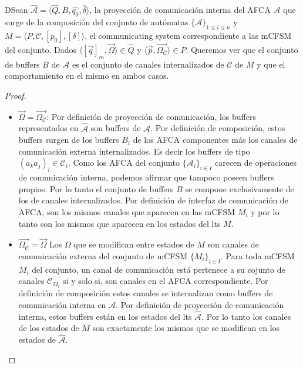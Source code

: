 \begin{lemma}\label{lemma2} DSean $\hat{\mathcal{A}}=\langle \hat{Q}, B, \hat{q_0}, \hat{\delta} \rangle$, la proyección de comunicación interna del AFCA $\mathcal{A}$ que surge de la composición del conjunto de autómatas  $\{\mathcal{A}\}_{1 \leq i \leq n}$  y $M= \langle P, \mathcal{C}, [p_0], [\delta] \rangle$, el communicating system correspondiente a las mCFSM del conjunto. Dados $\langle [\overrightarrow{q}]_m, \overrightarrow{\Omega} \rangle \in \hat{Q}$ y $\langle \overrightarrow{p}, \overrightarrow{\Omega_{\mathcal{C}}} \rangle \in P$. Queremos ver que el conjunto de buffers $B$ de $\mathcal{A}$ es el conjunto de canales internalizados de $\mathcal{C}$ de $M$ y que el comportamiento en el mismo en ambos casos.
\end{lemma}
\begin{proof}
    \begin{itemize}    
        \item \textbf{$\overrightarrow{\Omega} = \overrightarrow{\Omega_\mathcal{C}}$}: Por definición de proyección de comunicación, los buffers representados en $\hat{\mathcal{A}}$ son buffers de $\mathcal{A}$. Por definición de composición, estos buffers surgen de los buffers $B_i$ de los AFCA componentes más los canales de comunicación externa internalizados. Es decir los buffers de tipo $(a_ka_j)_l \in \mathcal{C}_i$. Como los AFCA del conjunto $\{\mathcal{A}_i\}_{i \in I}$ carecen de operaciones de comunicación interna, podemos afirmar que tampoco poseen buffers propios. Por lo tanto el conjunto de buffers $B$ se compone exclusivamente de los de canales internalizados. Por definición de interfaz de comunicación de AFCA, son los mismos canales que aparecen en las mCFSM $M_i$ y por lo tanto son los mismos que aparecen en los estados del lts $M$.

        \item \textbf{$\overrightarrow{\Omega_\mathcal{C}} = \overrightarrow{\Omega}$} Los $\Omega$ que se modifican entre estados de $M$ son canales de comunicación externa del conjunto de mCFSM $\{M_i\}_{i \in I}$. Para toda mCFSM $M_i$ del conjunto, un canal de comunicación está pertenece a su cojunto de canales $\mathcal{C}_{M_i}$ si y solo si, son canales en el AFCA correspondiente. Por definición de composición estos canales se internalizan como buffers de comunicación interna en $\mathcal{A}$. Por definición de proyección de comunicación interna, estos buffers están en los estados del lts $\hat{\mathcal{A}}$. Por lo tanto los canales de los estados de $M$ son exactamente los mismos que se modifican en los estados de $\hat{\mathcal{A}}$.
    \end{itemize}
\end{proof}


